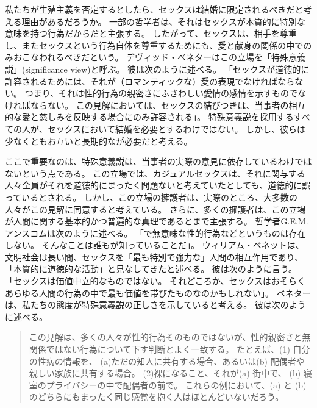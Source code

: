 \documentclass[paper=a4,book,openany]{jlreq} \usepackage{mystyle}
\begin{document}
私たちが生殖主義を否定するとしたら、セックスは結婚に限定されるべきだと考える理由があるだろうか。
一部の哲学者は、それはセックスが本質的に特別な意味を持つ行為だからだと主張する。
したがって、セックスは、相手を尊重し、またセックスという行為自体を尊重するためにも、愛と献身の関係の中でのみおこなわれるべきだという。
デヴィッド・ベネターはこの立場を「特殊意義説」(significance view)と呼ぶ。
彼は次のように述べる。
「セックスが道徳的に許容されるためには、それが（ロマンティックな）愛の表現でなければならない。
つまり、それは性的行為の親密さにふさわしい愛情の感情を示すものでなければならない。
この見解においては、セックスの結びつきは、当事者の相互的な愛と慈しみを反映する場合にのみ許容される」\citep[p.182]{benatar02:_two_views_sexual_ethic}。
特殊意義説を採用するすべての人が、セックスにおいて結婚を必要とするわけではない。
しかし、彼らは少なくともお互いと長期的なが必要だと考える。

ここで重要なのは、特殊意義説は、当事者の実際の意見に依存しているわけではないという点である。
この立場では、カジュアルセックスは、それに関与する人々全員がそれを道徳的にまったく問題ないと考えていたとしても、道徳的に誤っているとされる。
しかし、この立場の擁護者は、実際のところ、大多数の人々がこの見解に同意すると考えている。
さらに、多くの擁護者は、この立場が人間に関する基本的かつ普遍的な真理であるとまで主張する。
哲学者G.E.M. アンスコムは次のように述べる。
「で無意味な性的行為などというものは存在しない。
そんなことは誰もが知っていることだ」\citep{anscombe72contraception}。
ウィリアム・ベネットは、文明社会は長い間、セックスを「最も特別で強力な」人間の相互作用であり、「本質的に道徳的な活動」と見なしてきたと述べる。
彼は次のように言う。
「セックスは価値中立的なものではない。
それどころか、セックスはおそらくあらゆる人間の行為の中で最も価値を帯びたものなのかもしれない」\citep[p.19]{bennett98:_death_outrag}。
ベネターは、私たちの態度が特殊意義説の正しさを示していると考える。
彼は次のように述べる。

\begin{quote}
  この見解は、多くの人々が性的行為そのものではないが、性的親密さと無関係ではない行為について下す判断とよく一致する。
たとえば、(1) 自分の性病の情報を、 (a)ただの知人に共有する場合、あるいは(b) 配偶者や親しい家族に共有する場合。
(2)裸になること、それが(a) 街中で、 (b) 寝室のプライバシーの中で配偶者の前で。
これらの例において、(a) と (b) のどちらにもまったく同じ感覚を抱く人はほとんどいないだろう。
\citep[p.197]{benatar02:_two_views_sexual_ethic}
\end{quote}
\end{document}
